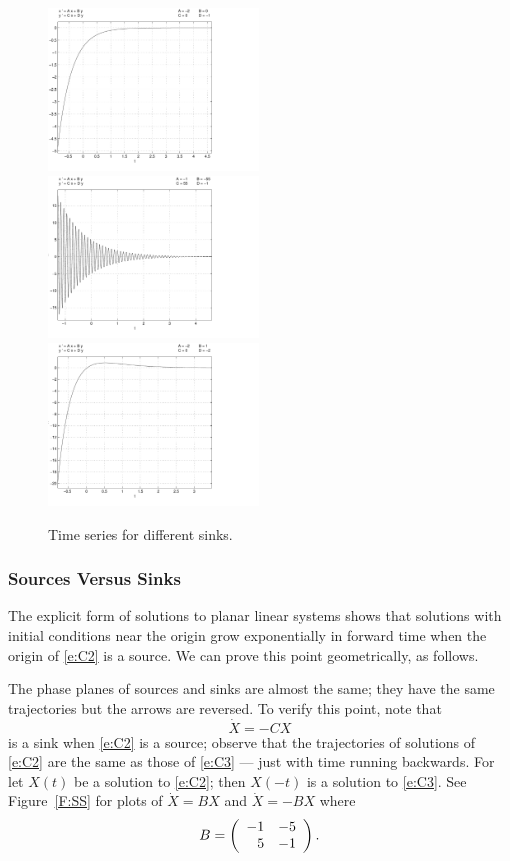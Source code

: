 \documentclass{ximera}
\begin{document}
\begin{figure}[htb]
           \centerline{%
           \includegraphics[width=2.2in]{../figures/expdamp.pdf}
	   \includegraphics[width=2.2in]{../figures/oscil.pdf}
	   \includegraphics[width=2.2in]{../figures/grdecay.pdf}}
           \caption{Time series for different sinks.}
           \label{F:oscil}
\end{figure}


\subsubsection*{Sources Versus Sinks}

The explicit form of solutions to planar linear systems shows that solutions
with initial conditions near the origin grow exponentially in forward time
when the origin of \eqref{e:C2} is a source.  We can prove this point
geometrically, as follows.

The phase planes of sources and sinks are almost the same; they have the
same trajectories but the arrows are reversed.  To verify this point, note
that
\begin{equation}  \label{e:C3}
\dot{X}=-CX
\end{equation}
is a sink when \eqref{e:C2} is a source; observe that the trajectories of
solutions of \eqref{e:C2} are the same as those of \eqref{e:C3} --- just with
time running backwards.  For let $X(t)$ be a solution to \eqref{e:C2}; then
$X(-t)$ is a solution to \eqref{e:C3}.   See Figure~\ref{F:SS} for plots of
$\dot{X}=BX$ and $\dot{X}=-BX$ where
\begin{equation}  \label{E:SS}
B = \left(\begin{array}{rr} -1 & -5\\ 5 &-1\end{array}\right).
\end{equation}
\end{document}

